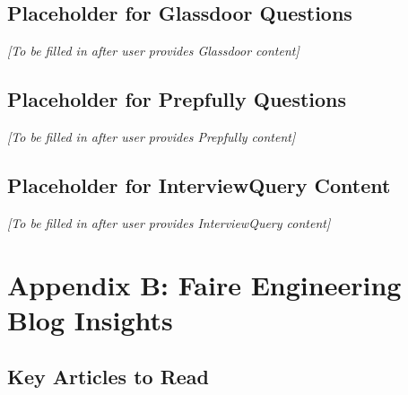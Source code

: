 \documentclass[11pt,letterpaper]{article}
\begin{document}
\subsection{Placeholder for Glassdoor Questions}

\textit{[To be filled in after user provides Glassdoor content]}

\subsection{Placeholder for Prepfully Questions}

\textit{[To be filled in after user provides Prepfully content]}

\subsection{Placeholder for InterviewQuery Content}

\textit{[To be filled in after user provides InterviewQuery content]}

\section{Appendix B: Faire Engineering Blog Insights}

\subsection{Key Articles to Read}
\end{document}
